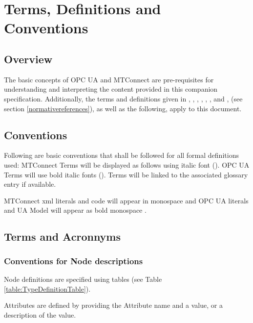 \section{Terms, Definitions and Conventions}\label{termsdefinitionsconventions}

\subsection{Overview}

The basic concepts of OPC UA and MTConnect are pre-requisites for understanding and interpreting the content provided in this companion specification. Additionally, the terms and definitions given in \cite{UAPart1}, \cite{UAPart2}, \cite{UAPart3}, \cite{UAPart5}, \cite{UAPart7}, \cite{UAPart10}, and \cite{MTCPart1}, (see section \ref{normativereferences}), as well as the following, apply to this document. 

\subsection{Conventions}\label{conventions}
Following are basic conventions that shall be followed for all formal definitions used: MTConnect Terms will be displayed as follows using italic font (). OPC UA Terms will use bold italic fonts (). Terms will be linked to the associated glossary entry if available.

MTConnect \gls{xml} literals and code will appear in monospace  and OPC UA literals and UA Model will appear as bold monospace .

\subsection{Terms and Acronnyms}

\printglossary[type=opc]

\printglossary[type=mtc]

\printacronyms  

\subsubsection{Conventions for Node descriptions}

\gls{Node} definitions are specified using tables (see Table \ref{table:TypeDefinitionTable}).

\glspl{Attribute} are defined by providing the Attribute name and a value, or a description of the value.

